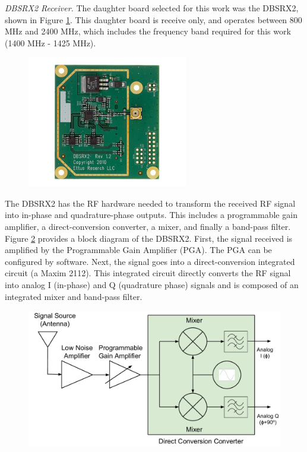 \emph{DBSRX2 Receiver.}  The daughter board selected for this work was the DBSRX2, shown in Figure \ref{dbsrx2}.  This daughter board is receive only, and operates between 800 MHz and 2400 MHz, which includes the frequency band required for this work (1400 MHz - 1425 MHz).

{\begin{figure}[h!tb] 
\centering
\includegraphics[width=7cm]{Images/dbsrx2.jpg}
\label{dbsrx2}
\end{figure}
}

The DBSRX2 has the RF hardware needed to transform the received RF signal into in-phase and quadrature-phase outputs.  This includes a programmable gain amplifier, a direct-conversion converter, a mixer, and finally a band-pass filter.  Figure \ref{dbsrx2_block} provides a block diagram of the DBSRX2.  First, the signal received is amplified by the Programmable Gain Amplifier (PGA).  The PGA can be configured by software.  Next, the signal goes into a direct-conversion integrated circuit (a Maxim 2112).  This integrated circuit directly converts the RF signal into analog I (in-phase) and Q (quadrature phase) signals and is composed of an integrated mixer and band-pass filter.

{\begin{figure}[h!tb] 
\centering
\includegraphics[width=12cm]{Images/DBSRX2_block.pdf}
\label{dbsrx2_block}
\end{figure}
}


